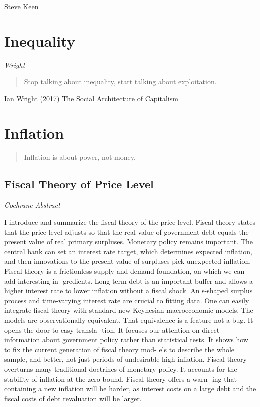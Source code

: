\documentclass[
]{book}
\begin{document}
\href{https://evonomics.com/why-economists-have-to-embrace-complexity-steve-keen/}{Steve Keen}

\hypertarget{inequality}{%
\chapter{Inequality}\label{inequality}}

\emph{Wright}

\begin{quote}
Stop talking about inequality, start talking about exploitation.
\end{quote}

\href{https://ianwrightsite.wordpress.com/2017/11/16/the-social-architecture-of-capitalism/}{Ian Wright (2017) The Social Architecture of Capitalism}

\hypertarget{inflation-1}{%
\chapter{Inflation}\label{inflation-1}}

\begin{quote}
Inflation is about power, not money.
\end{quote}

\hypertarget{fiscal-theory-of-price-level}{%
\section{Fiscal Theory of Price Level}\label{fiscal-theory-of-price-level}}

\emph{Cochrane Abstract}

I introduce and summarize the fiscal theory of the price level. Fiscal theory states
that the price level adjusts so that the real value of government debt equals the present
value of real primary surpluses. Monetary policy remains important. The central
bank can set an interest rate target, which determines expected inflation, and then
innovations to the present value of surpluses pick unexpected inflation. Fiscal theory
is a frictionless supply and demand foundation, on which we can add interesting in-
gredients. Long-term debt is an important buffer and allows a higher interest rate to
lower inflation without a fiscal shock. An s-shaped surplus process and time-varying
interest rate are crucial to fitting data. One can easily integrate fiscal theory with
standard new-Keynesian macroeconomic models. The models are observationally
equivalent. That equivalence is a feature not a bug. It opens the door to easy transla-
tion. It focuses our attention on direct information about government policy rather
than statistical tests. It shows how to fix the current generation of fiscal theory mod-
els to describe the whole sample, and better, not just periods of undesirable high
inflation. Fiscal theory overturns many traditional doctrines of monetary policy. It
accounts for the stability of inflation at the zero bound. Fiscal theory offers a warn-
ing that containing a new inflation will be harder, as interest costs on a large debt and
the fiscal costs of debt revaluation will be larger.
\end{document}
